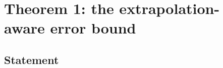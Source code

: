%
%

\section{Theorem 1: the extrapolation-aware error bound}
\label{sec:theorem1}

\subsection{Statement}

